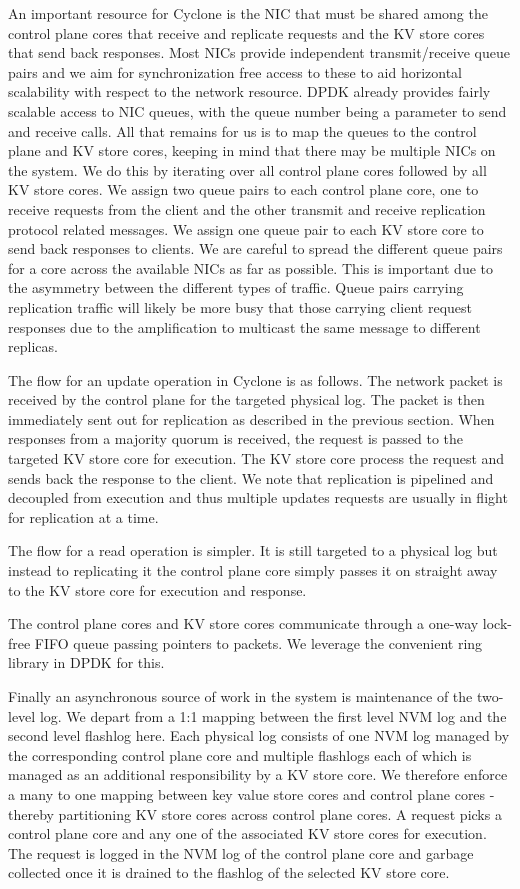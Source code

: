 \documentclass[10pt, preprint, nonatbib]{sigplanconf}
\begin{document}
An important resource for Cyclone is the NIC that must be shared among the
control plane cores that receive and replicate requests and the KV store cores
that send back responses. Most NICs provide independent transmit/receive queue
pairs and we aim for synchronization free access to these to aid horizontal
scalability with respect to the network resource. DPDK already provides fairly
scalable access to NIC queues, with the queue number being a parameter to send
and receive calls. All that remains for us is to map the queues to the control
plane and KV store cores, keeping in mind that there may be multiple NICs on the
system. We do this by iterating over all control plane cores followed by all KV
store cores. We assign two queue pairs to each control plane core, one to
receive requests from the client and the other transmit and receive replication
protocol related messages. We assign one queue pair to each KV store core to
send back responses to clients. We are careful to spread the different queue
pairs for a core across the available NICs as far as possible. This is important
due to the asymmetry between the different types of traffic. Queue pairs
carrying replication traffic will likely be more busy that those carrying client
request responses due to the amplification to multicast the same message to
different replicas.

The flow for an update operation in Cyclone is as follows. The network packet is
received by the control plane for the targeted physical log. The packet is then
immediately sent out for replication as described in the previous section. When
responses from a majority quorum is received, the request is passed to the
targeted KV store core for execution. The KV store core process the request and
sends back the response to the client. We note that replication is pipelined and
decoupled from execution and thus multiple updates requests are usually in
flight for replication at a time.

The flow for a read operation is simpler. It is still targeted to a physical log
but instead to replicating it the control plane core simply passes it on
straight away to the KV store core for execution and response.

The control plane cores and KV store cores communicate through a one-way
lock-free FIFO queue passing pointers to packets. We leverage the convenient
ring library in DPDK for this.

Finally an asynchronous source of work in the system is maintenance of the
two-level log. We depart from a 1:1 mapping between the first level NVM log and
the second level flashlog here. Each physical log consists of one NVM log
managed by the corresponding control plane core and multiple flashlogs each of
which is managed as an additional responsibility by a KV store core. We
therefore enforce a many to one mapping between key value store cores and
control plane cores - thereby partitioning KV store cores across control plane
cores. A request picks a control plane core and any one of the associated KV
store cores for execution. The request is logged in the NVM log of the control
plane core and garbage collected once it is drained to the flashlog of the
selected KV store core.
\end{document}
